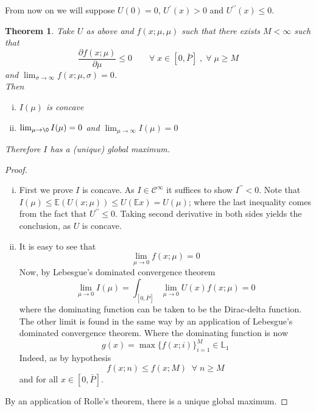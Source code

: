\documentclass[10pt]{article}
\newtheorem{theorem}{Theorem}
\begin{document}
From now on we will suppose $U(0)=0$, $U^{\prime}(x)>0$ and $U^{\prime\prime}(x)\leq 0$. 

\begin{theorem}
\label{existence_uniqueness}
Take $U$ as above and $f(x;\mu,\mu)$ such that there exists $M<\infty$ such that 
\[\frac{\partial f(x;\mu)}{\partial \mu}\leq 0\quad \quad \forall\;x\in[0,\bar{P}]\;,\;\forall\;\mu\geq M\]
and $\lim_{\sigma\rightarrow \infty} f(x;\mu,\sigma)=0$.\\

Then 
\begin{enumerate}[(i)]
    \item $I(\mu)$ is concave
    \item $\lim_{\mu\rightarrow\0} I(\mu)=0$ and $\lim_{\mu\rightarrow\infty} I(\mu)=0$
\end{enumerate}
Therefore $I$ has a (unique) global maximum.
\end{theorem}
\begin{proof}

\begin{enumerate} [(i)]
    \item First we prove $I$ is concave. As $I\in\mathcal{C}^{\infty} $ it suffices to show $I^{\prime\prime}<0$. 
    Note that $I(\mu)\leq \mathbb{E}(U(x;\mu)) \leq U(\mathbb{E}x)=U(\mu)$; where the last inequality comes from the fact that $U^{\prime\prime}\leq 0$.
    Taking second derivative in both sides yields the conclusion, as $U$ is concave.\\
    
    \item It is easy to see that 
    \[\lim_{\mu\rightarrow 0} f(x;\mu)=0\]
    Now, by Lebesgue's dominated convergence theorem
   \[ \lim_{\mu\rightarrow 0}I(\mu)=\int_{[0,\bar{P}]}\lim_{\mu\rightarrow 0}U(x)f(x;\mu)=0\]
    where the dominating function can be taken to be the Dirac-delta function.\\
    
    The other limit is found in the same way by an application of Lebesgue's dominated convergence theorem. Where the dominating function is now
    \[g(x)=\max\lbrace f(x;i)\rbrace_{i=1}^{M}\in\mathbb{L}_1\]
    Indeed, as by hypothesis
    \[f(x;n)\leq f(x;M) \;\;\forall\; n\geq M\]
    and for all $x\in[0,\bar{P}]$.
    
\end{enumerate}

By an application of Rolle's theorem, there is a unique global maximum. 
\end{proof}
\end{document}
